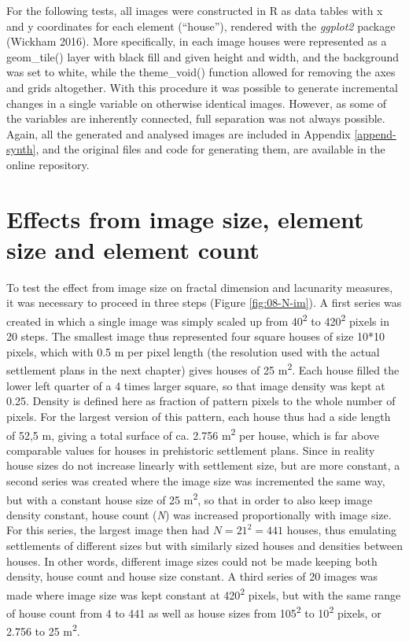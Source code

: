 \documentclass[
  12pt,
  a4paper, twoside]{book}
\begin{document}
For the following tests, all images were constructed in R as data tables with x and y coordinates for each element (``house''), rendered with the \emph{ggplot2} package (Wickham 2016). More specifically, in each image houses were represented as a geom\_tile() layer with black fill and given height and width, and the background was set to white, while the theme\_void() function allowed for removing the axes and grids altogether. With this procedure it was possible to generate incremental changes in a single variable on otherwise identical images. However, as some of the variables are inherently connected, full separation was not always possible. Again, all the generated and analysed images are included in Appendix \ref{append-synth}, and the original files and code for generating them, are available in the online repository.

\hypertarget{effects-from-image-size-element-size-and-element-count}{%
\section{Effects from image size, element size and element count}\label{effects-from-image-size-element-size-and-element-count}}

To test the effect from image size on fractal dimension and lacunarity measures, it was necessary to proceed in three steps (Figure \ref{fig:08-N-im}). A first series was created in which a single image was simply scaled up from 40\textsuperscript{2} to 420\textsuperscript{2} pixels in 20 steps. The smallest image thus represented four square houses of size 10*10 pixels, which with 0.5 m per pixel length (the resolution used with the actual settlement plans in the next chapter) gives houses of 25 m\textsuperscript{2}. Each house filled the lower left quarter of a 4 times larger square, so that image density was kept at 0.25. Density is defined here as fraction of pattern pixels to the whole number of pixels. For the largest version of this pattern, each house thus had a side length of 52,5 m, giving a total surface of ca. 2.756 m\textsuperscript{2} per house, which is far above comparable values for houses in prehistoric settlement plans. Since in reality house sizes do not increase linearly with settlement size, but are more constant, a second series was created where the image size was incremented the same way, but with a constant house size of 25 m\textsuperscript{2}, so that in order to also keep image density constant, house count (\emph{N}) was increased proportionally with image size. For this series, the largest image then had \(N = 21^2 = 441\) houses, thus emulating settlements of different sizes but with similarly sized houses and densities between houses. In other words, different image sizes could not be made keeping both density, house count and house size constant. A third series of 20 images was made where image size was kept constant at 420\textsuperscript{2} pixels, but with the same range of house count from 4 to 441 as well as house sizes from 105\textsuperscript{2} to 10\textsuperscript{2} pixels, or 2.756 to 25 m\textsuperscript{2}.
\end{document}
